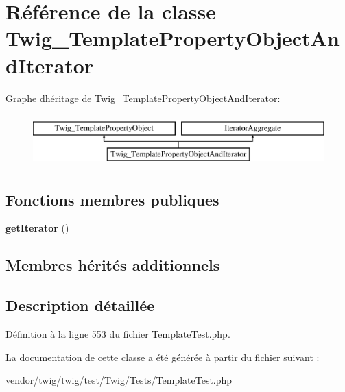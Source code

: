 \hypertarget{class_twig___template_property_object_and_iterator}{}\section{Référence de la classe Twig\+\_\+\+Template\+Property\+Object\+And\+Iterator}
\label{class_twig___template_property_object_and_iterator}
Graphe d\textquotesingle{}héritage de Twig\+\_\+\+Template\+Property\+Object\+And\+Iterator\+:\begin{figure}[H]
\begin{center}
\leavevmode
\includegraphics[height=2.000000cm]{class_twig___template_property_object_and_iterator}
\end{center}
\end{figure}
\subsection*{Fonctions membres publiques}
\begin{DoxyCompactItemize}
\item 
{\bfseries get\+Iterator} ()\hypertarget{class_twig___template_property_object_and_iterator_a7a9f937c2958e6f4dd7b030f86fb70b7}{}\label{class_twig___template_property_object_and_iterator_a7a9f937c2958e6f4dd7b030f86fb70b7}

\end{DoxyCompactItemize}
\subsection*{Membres hérités additionnels}


\subsection{Description détaillée}


Définition à la ligne 553 du fichier Template\+Test.\+php.



La documentation de cette classe a été générée à partir du fichier suivant \+:\begin{DoxyCompactItemize}
\item 
vendor/twig/twig/test/\+Twig/\+Tests/Template\+Test.\+php\end{DoxyCompactItemize}

